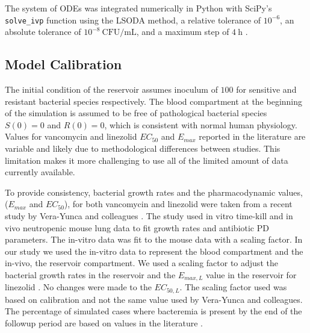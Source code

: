 \documentclass[12pt, draftcls, onecolumn]{IEEEtran}
\begin{document}
The system of ODEs was integrated numerically in Python with SciPy's
\texttt{solve\_ivp} function using the LSODA method, a relative tolerance
of $10^{-6}$, an absolute tolerance of $10^{-8}~\mathrm{CFU/mL}$, and a maximum
step of $4~\mathrm{h}$ \cite{2020SciPy-NMeth}.



\subsection{Model Calibration}
The initial condition of the reservoir assumes inoculum of $100$ for sensitive and resistant bacterial species respectively.
The blood compartment at the beginning of the simulation
is assumed to be free of pathological bacterial species $\mathit{S(0) = 0}$ and $\mathit{R(0) = 0}$, which is consistent with normal human physiology.  Values for vancomycin and linezolid $EC_{50}$ and $E_{max}$ reported in the literature
are variable and likely due to methodological differences between studies.  This limitation makes it more challenging
to use all of the limited amount of data currently available.

To provide consistency, bacterial growth rates and the pharmacodynamic values, ($E_{max}$ and $EC_{50}$), for both vancomycin and linezolid were taken from a recent study by Vera-Yunca and colleagues \cite{VeraYunca2025}.
The study used in vitro time-kill and in vivo neutropenic mouse lung data to fit growth rates
and antibiotic PD parameters.  The in-vitro data was fit to the mouse data with a scaling factor.
In our study we used the in-vitro data to represent the blood compartment and the in-vivo, the reservoir compartment.
We used a scaling factor to adjust the bacterial growth rates in the reservoir and the $E_{max,L}$ value in the reservoir for linezolid .
No changes were made to the $EC_{50,L}$.  The scaling factor used was based on calibration and not the same value used by
Vera-Yunca and colleagues.  The percentage of simulated cases where bacteremia is present by the end of the followup period
are based on values in the literature \cite{garciadelpozo2018factors}.  
\end{document}
